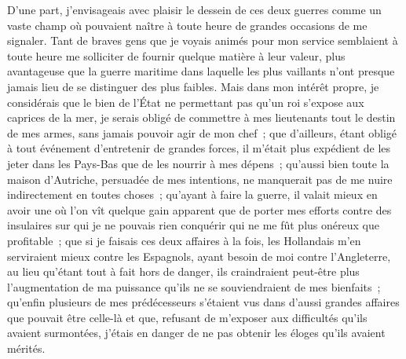 \documentclass[french,twoside]{book} %
\begin{document}
D’une part, j’envisageais avec plaisir le dessein de ces deux guerres comme un vaste champ où pouvaient naître à toute heure de grandes occasions de me signaler. Tant de braves gens que je voyais animés pour mon service semblaient à toute heure me solliciter de fournir quelque matière à leur valeur, plus avantageuse que la guerre maritime dans laquelle les plus vaillants n’ont presque jamais lieu de se distinguer des plus faibles. Mais dans mon intérêt propre, je considérais que le bien de l’État ne permettant pas qu’un roi s’expose aux caprices de la mer, je serais obligé de commettre à mes lieutenants tout le destin de mes armes, sans jamais pouvoir agir de mon chef ; que d’ailleurs, étant obligé à tout événement d’entretenir de grandes forces, il m’était plus expédient de les jeter dans les Pays-Bas que de les nourrir à mes dépens ; qu’aussi bien toute la maison d’Autriche, persuadée de mes intentions, ne manquerait pas de me nuire indirectement en toutes choses ; qu’ayant à faire la guerre, il valait mieux en avoir une où l’on vît quelque gain apparent que de porter mes efforts contre des insulaires sur qui je ne pouvais rien conquérir qui ne me fût plus onéreux que profitable ; que si je faisais ces deux affaires à la fois, les Hollandais m’en serviraient mieux contre les Espagnols, ayant besoin de moi contre l’Angleterre, au lieu qu’étant tout à fait hors de danger, ils craindraient peut-être plus l’augmentation de ma puissance qu’ils ne se souviendraient de mes bienfaits ; qu’enfin plusieurs de mes prédécesseurs s’étaient vus dans d’aussi grandes affaires que pouvait être celle-là et que, refusant de m’exposer aux difficultés qu’ils avaient surmontées, j’étais en danger de ne pas obtenir les éloges qu’ils avaient mérités.\par
\end{document}

